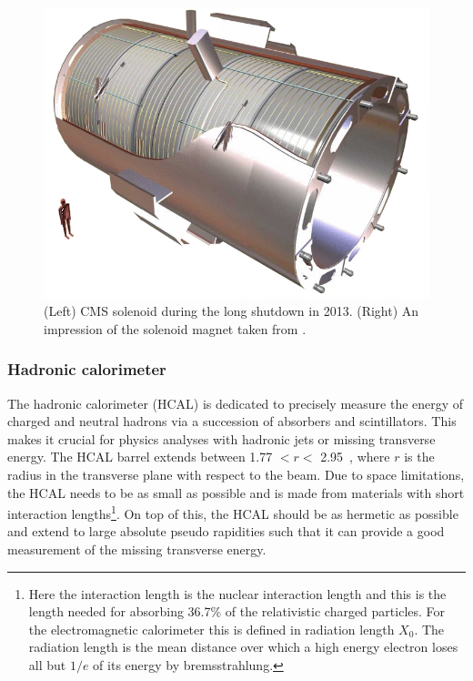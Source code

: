 \begin{figure}[htbp]
\begin{minipage}{0.39\linewidth}
		\includegraphics[width=\linewidth]{2_ExperimentalSetup/Figures/CMS-solenoid-magneta}
	\end{minipage}
		\caption{(Left) CMS solenoid during the long shutdown in 2013. (Right) An impression of the solenoid magnet taken from \cite{solenoid}.}
	
		\label{fig:CMSsolenoid}
	\end{figure}	
	
\subsubsection{Hadronic calorimeter}
\label{sec:HCAL}
The hadronic calorimeter (HCAL) is dedicated to precisely measure the energy of charged and neutral hadrons via a succession of absorbers and scintillators. This makes it crucial for physics analyses with hadronic jets or missing transverse energy. The HCAL barrel extends between 1.77 $<r<$ 2.95~\meter, where $r$ is the radius in the transverse plane with respect to the beam. Due to space limitations, the HCAL needs to be as small as possible and is made from materials with short interaction lengths\footnote{Here the interaction length is the nuclear interaction length and this is the length needed for absorbing 36.7\% of the relativistic charged particles. For the electromagnetic calorimeter this is defined in radiation length $X_0$. The radiation length is the mean distance over which a high energy electron loses all but $1/e$ of its energy by bremsstrahlung.}. 
On top of this, the HCAL should be as hermetic as possible and extend to large absolute pseudo rapidities such that it can provide a good measurement of the missing transverse energy. 

